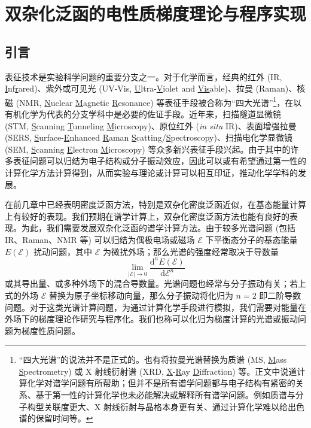 
\chapter{双杂化泛函的电性质梯度理论与程序实现}

\section{引言}

表征技术是实验科学问题的重要分支之一。对于化学而言，经典的红外 (IR, \underline{I}nf\underline{r}ared)、紫外或可见光 (UV-Vis, \underline{U}ltra-\underline{V}iolet and \underline{Vis}able)、拉曼 (Raman)、核磁 (NMR, \underline{N}uclear \underline{M}agnetic \underline{R}esonance) 等表征手段被合称为“四大光谱”\footnote{“四大光谱”的说法并不是正式的。也有将拉曼光谱替换为质谱 (MS, \underline{M}ass \underline{S}pectrometry) 或 X 射线衍射谱 (XRD, \underline{X}-\underline{R}ay \underline{D}iffraction) 等。正文中说道计算化学对谱学问题有所帮助；但并不是所有谱学问题都与电子结构有紧密的关系、基于第一性的计算化学也未必能解决或解释所有谱学问题。例如质谱与分子构型关联度更大、X 射线衍射与晶格本身更有关、通过计算化学难以给出色谱的保留时间等。}，在以有机化学为代表的分支学科中是必要的佐证手段。近年来，扫描隧道显微镜 (STM, \underline{S}canning \underline{T}unneling \underline{M}icroscopy)、原位红外 (\emph{in situ} IR)、表面增强拉曼 (SERS, \underline{S}urface-\underline{E}nhanced \underline{R}aman \underline{S}catting/\underline{S}pectroscopy)、扫描电化学显微镜 (SEM, \underline{S}canning \underline{E}lectron \underline{M}icroscopy) 等众多新兴表征手段兴起。由于其中的许多表征问题可以归结为电子结构或分子振动效应，因此可以或有希望通过第一性的计算化学方法计算得到，从而实验与理论或计算可以相互印证，推动化学学科的发展。

在前几章中已经表明密度泛函方法，特别是双杂化密度泛函近似，在基态能量计算上有较好的表现。我们预期在谱学计算上，双杂化密度泛函方法也能有良好的表现。为此，我们需要发展双杂化泛函的谱学计算方法。由于较多光谱问题 (包括 IR、Raman、NMR 等) 可以归结为偶极电场或磁场 $\pmb{\mathcal{E}}$ 下平衡态分子的基态能量 $E(\pmb{\mathcal{E}})$ 扰动问题，其中 $\pmb{\mathcal{E}}$ 为微扰外场；那么光谱的强度经常取决于导数量
\begin{equation}
  \lim_{|\pmb{\mathcal{E}}| \rightarrow 0} \frac{\mathrm{d}^n E(\pmb{\mathcal{E}})}{\mathrm{d} \pmb{\mathcal{E}}^n}
\end{equation}
或其导出量、或多种外场下的混合导数量。光谱问题也经常与分子振动有关；若上式的外场 $\pmb{\mathcal{E}}$ 替换为原子坐标移动向量，那么分子振动将化归为 $n = 2$ 即二阶导数问题。对于这类光谱计算问题，为通过计算化学手段进行模拟，我们需要对能量在外场下的梯度理论作研究与程序化。我们也称可以化归为梯度计算的光谱或振动问题为\textsf{梯度性质}问题。

